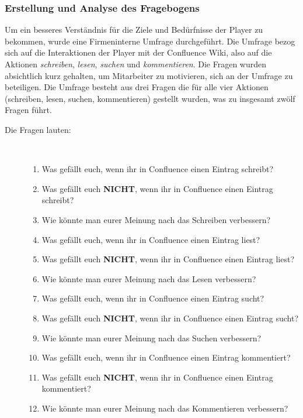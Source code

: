 \documentclass[a4paper,12pt]{scrartcl}
\begin{document}
\subsubsection{Erstellung und Analyse des Fragebogens}
Um ein besseres Verständnis für die Ziele und Bedürfnisse der Player zu bekommen, wurde eine Firmeninterne Umfrage durchgeführt. Die Umfrage bezog sich auf die Interaktionen der Player mit der Confluence Wiki, also auf die Aktionen \textit{schreiben}, \textit{lesen}, \textit{suchen} und \textit{kommentieren}. Die Fragen wurden absichtlich kurz gehalten, um Mitarbeiter zu motivieren, sich an der Umfrage zu beteiligen. Die Umfrage besteht aus drei Fragen die für alle vier Aktionen (schreiben, lesen, suchen, kommentieren) gestellt wurden, was zu insgesamt zwölf Fragen führt.
\begin{description}
   \item[Die Fragen lauten:]~\par
   \begin{enumerate}
      \item Was gefällt euch, wenn ihr in Confluence einen Eintrag schreibt?
      \item Was gefällt euch \textbf{NICHT}, wenn ihr in Confluence einen Eintrag schreibt?
      \item Wie könnte man eurer Meinung nach das Schreiben verbessern?
      
      \item Was gefällt euch, wenn ihr in Confluence einen Eintrag liest?
      \item Was gefällt euch \textbf{NICHT}, wenn ihr in Confluence einen Eintrag liest?
      \item Wie könnte man eurer Meinung nach das Lesen verbessern?
      
      \item Was gefällt euch, wenn ihr in Confluence einen Eintrag sucht?
      \item Was gefällt euch \textbf{NICHT}, wenn ihr in Confluence einen Eintrag sucht?
      \item Wie könnte man eurer Meinung nach das Suchen verbessern?
      
      \item Was gefällt euch, wenn ihr in Confluence einen Eintrag kommentiert?
      \item Was gefällt euch \textbf{NICHT}, wenn ihr in Confluence einen Eintrag kommentiert?
      \item Wie könnte man eurer Meinung nach das Kommentieren verbessern?
   \end{enumerate}
\end{description}
\end{document}
